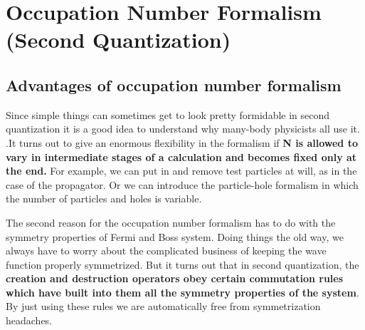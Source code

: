 \section{Occupation Number Formalism (Second Quantization)}
\subsection{Advantages of occupation number formalism}
Since simple things can sometimes get to look pretty formidable in second quantization it is a good idea to understand why many-body physicists all use it. .It turns out to give an enormous flexibility in the formalism if \textbf{N is allowed to vary in intermediate stages of a calculation and becomes fixed only at the end.} For example, we can put in and remove test particles at will, as in the case of the propagator. Or we can introduce the particle-hole formalism in which the number of particles and holes is variable.

The second reason for the occupation number formalism has to do with the symmetry properties of Fermi and Boss system. Doing things the old
way, we always have to worry about the complicated business of keeping the wave function properly symmetrized. But it turns out that in second quantization, the \textbf{creation and destruction operators obey certain commutation rules which have built into them all the symmetry properties of the system}. By just using these rules we are automatically free from symmetrization headaches.

